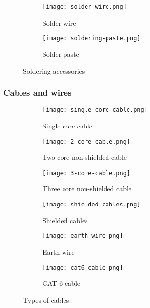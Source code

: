 \documentclass[a4paper,12pt]{article}
\begin{document}
					\begin{figure}[H]
						\begin{subfigure}{0.5\textwidth}
							\centering				
							\texttt{[image: solder-wire.png]}
							\caption{Solder wire}
							\label{subfig:solder-wire}
						\end{subfigure}
						\hfill
						\begin{subfigure}{0.5\textwidth}
							\centering				
							\texttt{[image: soldering-paste.png]}
							\caption{Solder paste}
							\label{subfig:solder-paste}
						\end{subfigure}
						\label{soldering-accessories}
						\caption{Soldering accessories}
					\end{figure}
						
				\subsubsection*{Cables and wires}
					\begin{figure}[H]
						\begin{subfigure}{0.4\textwidth}
							\centering				
							\texttt{[image: single-core-cable.png]}
							\caption{Single core cable}
							\label{fig:single-core-cable}
						\end{subfigure}
						\hfill
						\begin{subfigure}{0.4\textwidth}
							\centering				
							\texttt{[image: 2-core-cable.png]}
							\caption{Two core non-shielded cable}
							\label{subfig:two-core-cable}
						\end{subfigure}
						\hfill
						\begin{subfigure}{0.4\textwidth}
							\centering				
							\texttt{[image: 3-core-cable.png]}
							\caption{Three core non-shielded cable}
							\label{subfig:three-core-cable}
						\end{subfigure}
						\hfill
						\begin{subfigure}{0.4\textwidth}
							\centering				
							\texttt{[image: shielded-cables.png]}
							\caption{Shielded cables}
							\label{subfig:shielded-cable}
						\end{subfigure}
						\hfill
						\begin{subfigure}{0.4\textwidth}
							\centering				
							\texttt{[image: earth-wire.png]}
							\caption{Earth wire}
							\label{subfig:earth-wire}
						\end{subfigure}			
						\hfill
						\begin{subfigure}{0.4\textwidth}
							\centering				
							\texttt{[image: cat6-cable.png]}
							\caption{CAT 6 cable}
							\label{subfig:cat6-cable}
						\end{subfigure}
						\label{fig:types-of-cables}
						\caption{Types of cables}
					\end{figure}			
						
\end{document}
